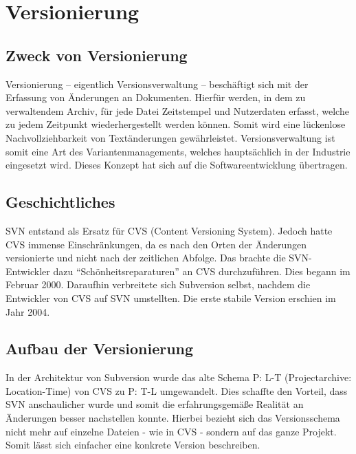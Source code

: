 \section{Versionierung}%

\subsection{Zweck von Versionierung}

Versionierung -- eigentlich Versionsverwaltung -- beschäftigt sich mit der Erfassung von Änderungen an Dokumenten. Hierfür werden, in dem zu verwaltendem Archiv, für jede Datei Zeitstempel und Nutzerdaten erfasst, welche zu jedem Zeitpunkt wiederhergestellt werden können. Somit wird eine lückenlose Nachvollziehbarkeit von Textänderungen gewährleistet. Versionsverwaltung ist somit eine Art des Variantenmanagements, welches hauptsächlich in der Industrie eingesetzt wird. Dieses Konzept hat sich auf die Softwareentwicklung übertragen. 

\subsection{Geschichtliches}
SVN entstand als Ersatz für CVS (Content Versioning System). Jedoch hatte CVS immense Einschränkungen, da es nach den Orten der Änderungen versionierte und nicht nach der zeitlichen Abfolge. Das brachte die SVN-Entwickler dazu "`Schönheitsreparaturen"' an CVS durchzuführen. Dies begann im Februar 2000. Daraufhin verbreitete sich Subversion selbst, nachdem die Entwickler von CVS auf SVN umstellten. Die erste stabile Version erschien im Jahr 2004.

\subsection{Aufbau der Versionierung}
In der Architektur von Subversion wurde das alte Schema P: L-T (Projectarchive: Location-Time) von CVS zu P: T-L umgewandelt. Dies schaffte den Vorteil, dass SVN anschaulicher wurde und somit die erfahrungsgemäße Realität an Änderungen besser nachstellen konnte. Hierbei bezieht sich das Versionsschema nicht mehr auf einzelne Dateien - wie in CVS - sondern auf das ganze Projekt. Somit lässt sich einfacher eine konkrete Version beschreiben. \\